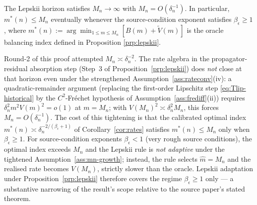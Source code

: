 
\begin{assumption}\label{ass:mn-growth}
The Lepskii horizon satisfies $M_n \to \infty$ with $M_n = O(\delta_n^{-1})$.
In particular, $m^*(n) \le M_n$ eventually whenever the source-condition
exponent satisfies $\beta_\epsilon \ge 1$, where
$m^*(n) := \arg\min_{1 \le m \le M_n}[B(m) + \tilde V(m)]$ is the oracle
balancing index defined in Proposition \textup{\ref{prp:lepskii}}.
\end{assumption}

\begin{remark}\label{rem:scope}
Round-2 of this proof attempted $M_n \asymp \delta_n^{-2}$. The rate
algebra in the propagator-residual absorption step (Step~3 of
Proposition~\ref{prp:lepskii}) does \emph{not} close at that horizon
even under the strengthened
Assumption~\ref{ass:rateconv}\textup{(iv)}: a quadratic-remainder
argument (replacing the first-order Lipschitz step \eqref{eq:Tlip-historical} by the
$C^2$-Fr\'echet hypothesis of
Assumption~\ref{ass:frediff}\textup{(ii)}) requires
$\delta_n^{2} m^{2} V(m)^{2} = o(1)$ at $m = M_n$; with
$V(M_n)^2 \asymp \delta_n^{2}M_n$, this forces $M_n = O(\delta_n^{-1})$.
The cost of this tightening is that the calibrated optimal index
$m^{*}(n) \asymp \delta_n^{-2/(\beta_\epsilon + 1)}$ of
Corollary~\ref{cor:rates} satisfies $m^{*}(n) \le M_n$ only when
$\beta_\epsilon \ge 1$. For source-condition exponents
$\beta_\epsilon < 1$ (very rough source conditions), the optimal index
exceeds $M_n$ and the Lepskii rule is \emph{not adaptive} under the
tightened Assumption~\ref{ass:mn-growth}; instead, the rule selects
$\hat m = M_n$ and the realised rate becomes $V(M_n)$, strictly slower
than the oracle. Lepskii adaptation under
Proposition~\ref{prp:lepskii} therefore covers the regime
$\beta_\epsilon \ge 1$ only --- a substantive narrowing of the result's
scope relative to the source paper's stated theorem.
\end{remark}
